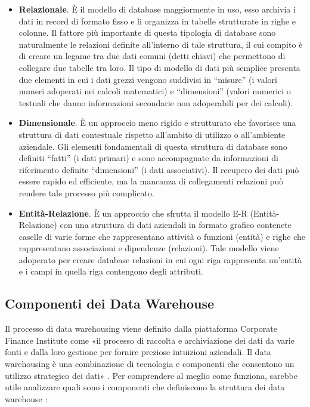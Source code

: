 \begin{itemize}
    \item \textbf{Relazionale}. È il modello di database maggiormente in uso, esso archivia i dati in record di formato fisso e li organizza in tabelle strutturate in righe e colonne. Il fattore più importante di questa tipologia di database sono naturalmente le relazioni definite all'interno di tale struttura, il cui compito è di creare un legame tra due dati comuni (detti chiavi) che permettono di collegare due tabelle tra loro. Il tipo di modello di dati più semplice presenta due elementi in cui i dati grezzi vengono suddivisi in “misure” (i valori numeri adoperati nei calcoli matematici) e “dimensioni” (valori numerici o testuali che danno informazioni secondarie non adoperabili per dei calcoli).
    \item \textbf{Dimensionale}. È un approccio meno rigido e strutturato che favorisce una struttura di dati contestuale rispetto all'ambito di utilizzo o all'ambiente aziendale. Gli elementi fondamentali di questa struttura di database sono definiti “fatti” (i dati primari) e sono accompagnate da informazioni di riferimento definite “dimensioni” (i dati associativi). Il recupero dei dati può essere rapido ed efficiente, ma la mancanza di collegamenti relazioni può rendere tale processo più complicato. 
    \item \textbf{Entità-Relazione}. È un approccio che sfrutta il modello E-R (Entità-Relazione) con una struttura di dati aziendali in formato grafico contenete caselle di varie forme che rappresentano attività o funzioni (entità) e righe che rappresentano associazioni e dipendenze (relazioni). Tale modello viene adoperato per creare database relazioni in cui ogni riga rappresenta un'entità e i campi in quella riga contengono degli attributi.
\end{itemize}

\subsection{Componenti dei Data Warehouse}
Il processo di data warehousing viene definito dalla piattaforma Corporate Finance Institute come «il processo di raccolta e archiviazione dei dati da varie fonti e dalla loro gestione per fornire preziose intuizioni aziendali. Il data warehousing è una combinazione di tecnologia e componenti che consentono un utilizzo strategico dei dati» \cite{cfi_data_warehousing}. Per comprendere al meglio come funziona, sarebbe utile analizzare quali sono i componenti che definiscono la struttura dei data warehouse \cite{altexsoft_data_warehouse_concepts}:

